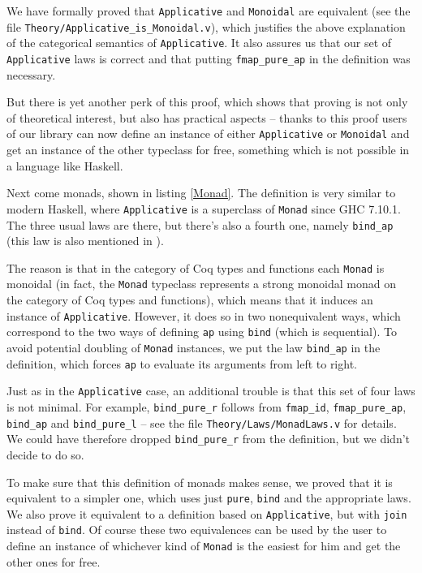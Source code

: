 \documentclass[declaration,inz,english,shortabstract]{iithesis}
\newcommand{\m}[1]{\texttt{#1}}
\begin{document}
We have formally proved that \m{Applicative} and \m{Monoidal} are equivalent (see the file \m{Theory/Applicative\_is\_Monoidal.v}), which justifies the above explanation of the categorical semantics of \m{Applicative}. It also assures us that our set of \m{Applicative} laws is correct and that putting \m{fmap\_pure\_ap} in the definition was necessary.

But there is yet another perk of this proof, which shows that proving is not only of theoretical interest, but also has practical aspects -- thanks to this proof users of our library can now define an instance of either \m{Applicative} or \m{Monoidal} and get an instance of the other typeclass for free, something which is not possible in a language like Haskell.


Next come monads, shown in listing \ref{Monad}. The definition is very similar to modern Haskell, where \m{Applicative} is a superclass of \m{Monad} since GHC 7.10.1. The three usual laws are there, but there's also a fourth one, namely \m{bind\_ap} (this law is also mentioned in \cite{HackageMonad}).

The reason is that in the category of Coq types and functions each \m{Monad} is monoidal (in fact, the \m{Monad} typeclass represents a strong monoidal monad on the category of Coq types and functions), which means that it induces an instance of \m{Applicative}. However, it does so in two nonequivalent ways, which correspond to the two ways of defining \m{ap} using \m{bind} (which is sequential). To avoid potential doubling of \m{Monad} instances, we put the law \m{bind\_ap} in the definition, which forces \m{ap} to evaluate its arguments from left to right.

Just as in the \m{Applicative} case, an additional trouble is that this set of four laws is not minimal. For example, \m{bind\_pure\_r} follows from \m{fmap\_id}, \m{fmap\_pure\_ap}, \m{bind\_ap} and \m{bind\_pure\_l} -- see the file \m{Theory/Laws/MonadLaws.v} for details. We could have therefore dropped \m{bind\_pure\_r} from the definition, but we didn't decide to do so.

To make sure that this definition of monads makes sense, we proved that it is equivalent to a simpler one, which uses just \m{pure}, \m{bind} and the appropriate laws. We also prove it equivalent to a definition based on \m{Applicative}, but with \m{join} instead of \m{bind}. Of course these two equivalences can be used by the user to define an instance of whichever kind of \m{Monad} is the easiest for him and get the other ones for free.
\end{document}
